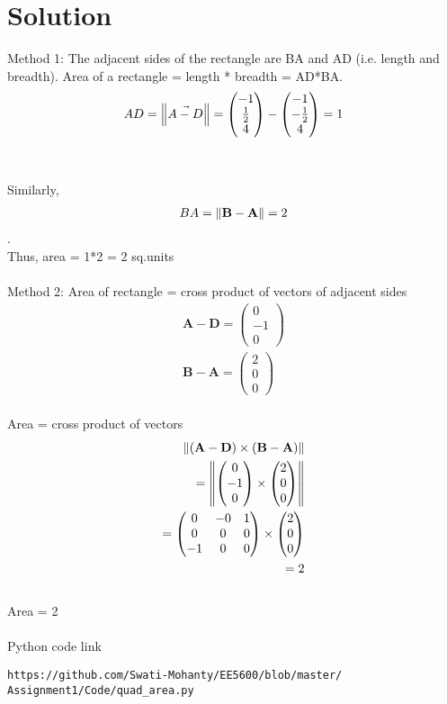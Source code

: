 \documentclass[journal,12pt,twocolumn]{IEEEtran}
\newcommand{\myvec}[1]{\ensuremath{\begin{pmatrix}#1\end{pmatrix}}}
\let\vec\mathbf
\begin{document}
\section{Solution}
Method 1: The adjacent sides of the rectangle are BA and AD (i.e. length and breadth). Area of a rectangle = length * breadth = AD*BA.
\\\begin{align}
    AD = \norm{\Vec{A-D}}
    =\myvec{-1 \\\frac{1}{2} \\4} - \myvec{-1 \\-\frac{1}{2} \\4} = 1
\end{align}
\\
\\Similarly, \\\begin{align}
    BA =  \norm{\vec{B-A} }  = 2
\end{align}. 
\\Thus, area = 1*2 = 2 sq.units
\\
\\Method 2: Area of rectangle = cross product of vectors of adjacent sides
\\\begin{align}
    \vec{A} - \vec{D} = \myvec{0 \\-1 \\0} 
    \\
    \vec{B} -\vec{A} = \myvec{2 \\0 \\0}
\end{align}   
\\Area = cross product of vectors
\\\begin{align}
    \norm{(\vec{A-D}) \times  (\vec{B-A})}   
    \\=\norm{\myvec{0 \\-1 \\0}  \times \myvec{2 \\0 \\0}} 
    \\=\myvec{0&-0&1 \\0&0&0 \\-1&0&0} \times \myvec{2 \\0 \\0}
    \\= 2
\end{align}
\\Area = 2 
\\
\\Python code link 
\begin{lstlisting}
https://github.com/Swati-Mohanty/EE5600/blob/master/
Assignment1/Code/quad_area.py
\end{lstlisting}
\end{document}
